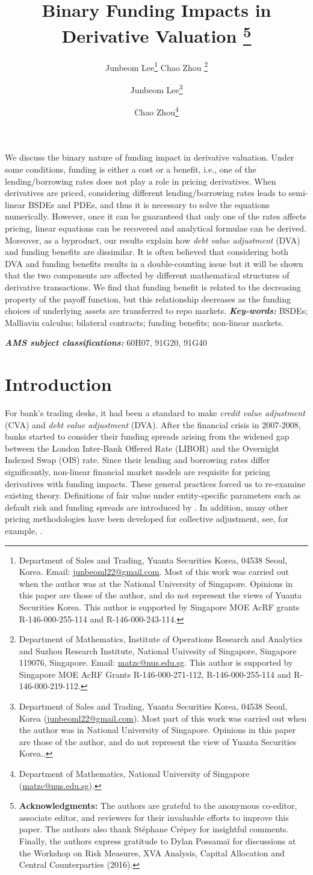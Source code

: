 \documentclass[a4paper, 11pt]{article}              %
\title{Binary Funding Impacts in Derivative Valuation
   \thanks{\textbf{Acknowledgments: } The authors are grateful to the anonymous
     co-editor, associate editor, and reviewers for their invaluable efforts to
     improve this paper. The authors also thank St\'ephane Cr\'epey for
     insightful comments. Finally, the authors express gratitude to Dylan
     Possama\"{i} for discussions at the Workshop on Risk Measures, XVA
     Analysis, Capital Allocation and Central Counterparties (2016).}  }
\author{Junbeom Lee\thanks{ Department of Sales and Trading, Yuanta Securities
     Korea, 04538 Seoul, Korea.  Email:
     \href{junbeoml22@gmail.com}{junbeoml22@gmail.com}.
     Most  of this work was carried out when the author was at the National
     University of Singapore. Opinions in this paper are those of the author,
     and do not represent the views of Yuanta Securities Korea.
     This author is supported by Singapore MOE AcRF grants R-146-000-255-114 and
     R-146-000-243-114.  } \quad \quad \quad
   Chao Zhou \thanks{
     Department of Mathematics, Institute of Operations Research and Analytics
     and Suzhou Research Institute, National Univesity of Singapore, Singapore
     119076, Singapore.
     Email: \href{mailto:matzc@nus.edu.sg}{matzc@nus.edu.sg}.
     This author is supported by Singapore MOE
     AcRF Grants  R-146-000-271-112, R-146-000-255-114 and R-146-000-219-112. }}
\author{Junbeom Lee\footnote{Department of Sales and Trading, Yuanta Securities
    Korea, 04538 Seoul, Korea
    (\href{junbeoml22@gmail.com}{junbeoml22@gmail.com}).
    Most part of this work was carried out when 
    the author was in National University of Singapore. Opinions in this paper
    are those of the author, and do not represent the view of Yuanta Securities Korea..}
\and Chao Zhou\footnote{Department of Mathematics,  National University of
  Singapore (\href{mailto:matzc@nus.edu.sg}{matzc@nus.edu.sg}).
}}
\date{}
\numberwithin{equation}{section}
\theoremstyle{plain}
\newcommand{\1}{\mathds{1}}
\theoremstyle{plain}
\theoremstyle{definition}
\theoremstyle{plain}
\renewenvironment{abstract}{\small
  \begin{center}
  \bfseries \abstractname\vspace{-.5em}\vspace{0pt}
  \end{center}
  \list{}{
    \setlength{\leftmargin}{0.7cm}%
    \setlength{\rightmargin}{\leftmargin}%
  }%
  \item\relax}   
 {\endlist}
\providecommand{\keywords}[1]{\textbf{\textit{Key-words: }} #1}
\providecommand{\AMS}[1]{\textbf{\textit{AMS subject classifications: }} #1}
\begin{document}
\begin{titlepage}
  \vspace*{-1cm} 
{\let\newpage\relax\maketitle}   
\begin{abstract} 
  We discuss the binary nature of funding impact in derivative valuation.  Under
  some conditions, funding is either a cost or a benefit, i.e., one of the
  lending/borrowing rates does not play a role in pricing derivatives.  When
  derivatives are priced, considering different lending/borrowing rates leads to
  semi-linear BSDEs and PDEs, and thus it is necessary to solve  the equations
  numerically. However, once it can be guaranteed that only one of the rates affects
  pricing, linear equations can be recovered and analytical formulae can be derived.
  Moreover, as a byproduct, our results explain how \textit{debt value
    adjustment} (DVA) and funding benefits are dissimilar.  It is often believed
  that considering both DVA and funding benefits results in a double-counting
  issue but it will be shown that the two components are affected by different
  mathematical structures of derivative transactions. We find that
  funding benefit is related to the decreasing property of the payoff function, 
  but this relationship decreases as the funding choices of underlying
  assets are transferred to repo markets.
\end{abstract}
\vspace{0.3cm} 
\noindent\keywords{BSDEs; Malliavin calculus; bilateral contracts; funding benefits; non-linear markets.}

\noindent\AMS{60H07, 91G20, 91G40}
\end{titlepage}

\addtocounter{page}{1}

\section{Introduction}
For bank's trading desks, it had been a standard to make \textit{credit value
  adjustment} (CVA) and \textit{debt value adjustment} (DVA). After the
financial crisis in 2007-2008, banks started to consider their funding spreads
arising from the widened gap between the London Inter-Bank Offered Rate (LIBOR)
and the Overnight Indexed Swap (OIS) rate. Since their lending and borrowing
rates differ significantly, non-linear financial market models are requisite for
pricing derivatives with funding impacts. These general practices forced us to
re-examine existing theory. Definitions of fair value under entity-specific
parameters such as default risk and funding spreads are introduced by
\cite{bielecki2015valuation, bielecki2018arbitrage, bichuch2017arbitrage,
  nie2018american}. In addition, many other pricing methodologies have been
developed for collective adjustment, see, for example,
\cite{piterbarg2010funding, wu2015cva, li2016fva, brigo2011collateral,
  crepey2015bilateral1, crepey2015bilateral2}.
\end{document}
